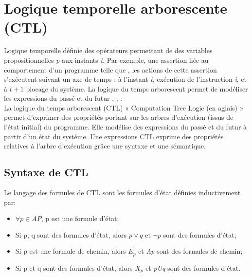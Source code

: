 \section{Logique temporelle arborescente (CTL)}
Logique temporelle définie des opérateurs permettant de  des variables propositionnelles \emph{p} aux instants \emph{t}. Par exemple, une assertion liée au comportement d'un programme telle que , les actions de cette assertion s'exécutent suivant un axe de temps : à l'instant \emph{t}, exécution de l'instruction \emph{i}, et à \emph{$t + 1$} blocage du système. La logique du temps arborescent permet de modéliser les expressions du passé et du futur \citep{Bakker1983}, \citep{Clarke1981}, \citep{Emerson1983}.\\

La logique du temps arborescent (CTL) « Computation Tree Logic (en aglais) » permet d'exprimer des propriétés portant sur les arbres d'exécution (issus de l'état initial) du programme. Elle modélise des expressions du passé et du futur à partir d'un état du système. Une expressions CTL exprime des propriétés relatives à l'arbre d'exécution grâce une syntaxe et une sémantique.

\subsection{Syntaxe de CTL}
Le langage des formules de CTL sont les formules d'état définies inductivement par:
\begin{itemize}
	\item  $ \forall p \in AP$, p est une formule d'état;
	\item  Si p, q sont des formules d'état, alors $p \vee q$ et $\neg p$ sont des formules d'état;
	\item Si p est une formule de chemin, alors \emph{$E_p$} et \emph{Ap} sont des formules de chemin;
	\item Si p et q sont des formules d'état, alors \emph{$X_p$} et \emph{pUq} sont des formules d'état.
\end{itemize}

